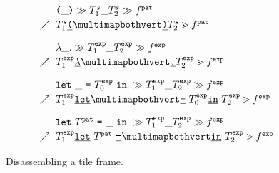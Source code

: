 \begin{figure}
  \newcommand{\du}{\nearrow}
  \newcommand{\vstretch}{\vspace{0.3cm}}
  \[
    \arraycolsep=3pt
    \def\arraystretch{1.2}
    \begin{array}{rl}
      & \tframelit{
        \sparen{\_}
      }{
        \tframelit{\tiles^s_1\_\tiles^s_2}{\tfrelem^{\pat}}
      } \\
      \du
      & \zipper{
        \pointing{\tiles^s_1\tokenLit{\texttt{(}}~}{~\tokenLit{\texttt{)}}\tiles^s_2}
      }{
        \tfrelem^{\pat}
      } \vstretch \\

      & \tframelit{
        \slam{\_}{}
      }{
        \tframelit{\tiles^{\expr}_1\_\tiles^{\expr}_2}{\tfrelem^{\expr}}
      } \\
      \du
      & \zipper{
        \pointing{\tiles^{\expr}_1\tokenLit{\lambda}~}{~\tokenLit{\texttt{.}}\tiles^{\expr}_2}
      }{
        \tfrelem^{\expr}
      } \vstretch \\

      & \tframelit{
        \slet{\_}{\tiles^{\expr}_0}{}
      }{
        \tframelit{\tiles^{\expr}_1\_\tiles^{\expr}_2}{\tfrelem^{\expr}}
      } \\
      \du
      & \zipper{
        \pointing{
          \tiles^{\expr}_1\tokenLit{\texttt{let}}~
        }{
          ~\tokenLit{\texttt{=}}~\tiles^{\expr}_0\tokenLit{\texttt{in}}~\tiles^{\expr}_2
        }
      }{
        \tfrelem^{\expr}
      } \vstretch \\

      & \tframelit{
        \slet{\tiles^{\pat}}{\_}{}
      }{
        \tframelit{\tiles^{\expr}_1\_\tiles^{\expr}_2}{\tfrelem^{\expr}}
      } \\
      \du
      & \zipper{
        \pointing{
          \tiles^{\expr}_1\tokenLit{\texttt{let}}~\tiles^{\pat}~\tokenLit{\texttt{=}}~
        }{
          ~\tokenLit{\texttt{in}}~\tiles^{\expr}_2
        }
      }{
        \tfrelem^{\expr}
      }
  \end{array}\]
  \caption{
    Disassembling a tile frame. 
  }
  \label{fig:disassemble-tile}
\end{figure}
